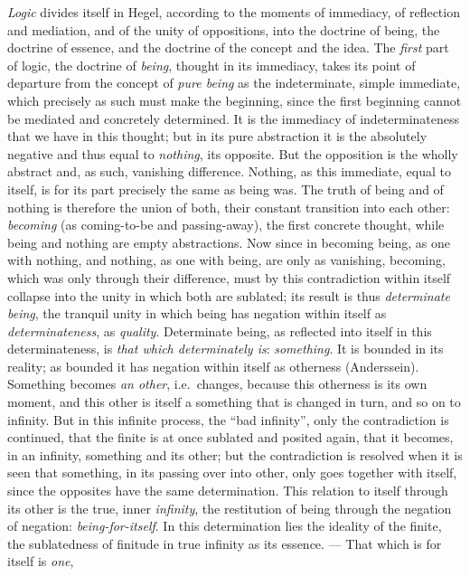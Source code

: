 \emph{Logic} divides itself in Hegel, according to the moments of
immediacy, of reflection and mediation, and of the unity of
oppositions, into the doctrine of being, the doctrine of essence, and
the doctrine of the concept and the idea. The \emph{first} part of
logic, the doctrine of \emph{being}, thought in its
immediacy, takes its point of departure from the concept of \emph{pure
being} as the indeterminate, simple immediate, which precisely as such
must make the beginning, since the first beginning cannot be mediated
and concretely determined. It is the immediacy of indeterminateness that
we have in this thought; but in its pure abstraction it is the
absolutely negative and thus equal to \emph{nothing}, its opposite. But
the opposition is the wholly abstract and, as such, vanishing
difference. Nothing, as this immediate, equal to itself, is for its part
precisely the same as being was. The truth of being and of nothing is
therefore the union of both, their constant transition into each other:
\emph{becoming} (as coming-to-be and passing-away), the first concrete
thought, while being and nothing are empty abstractions. Now since in
becoming being, as one with nothing, and nothing, as one with being, are
only as vanishing, becoming, which was only through their difference,
must by this contradiction within itself collapse into the unity in
which both are sublated; its result is thus \emph{determinate being},
the tranquil unity in which being has negation within itself as
\emph{determinateness}, as \emph{quality}. Determinate being, as
reflected into itself in this determinateness, is \emph{that which
determinately is}: \emph{something}. It is bounded in its reality; as
bounded it has negation within itself as otherness (Anderssein).
Something becomes \emph{an other}, i.e.\ changes, because this otherness
is its own moment, and this other is itself a something that is changed
in turn, and so on to infinity. But in this infinite process, the ``bad
infinity'', only the contradiction is continued, that the finite is at
once sublated and posited again, that it becomes, in an infinity,
something and its other; but the contradiction is resolved when it is
seen that something, in its passing over into other, only goes together
with itself, since the opposites have the same determination. This
relation to itself through its other is the true, inner
\emph{infinity}, the restitution of being through the negation of
negation: \emph{being-for-itself}. In this determination lies the
ideality of the finite, the sublatedness of finitude in true
infinity as its essence. --- That which is for itself is \emph{one},
